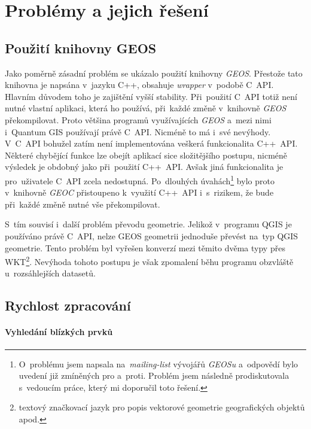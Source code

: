 \chapter{Problémy a jejich řešení}
\label{7-problemy}

\section{Použití knihovny GEOS}
\label{problemy-geos}
Jako poměrně zásadní problém se ukázalo použití knihovny \textit{GEOS}. 
Přestože tato knihovna je napsána v~jazyku C++, obsahuje \textit{wrapper} 
v~podobě C~API. Hlavním důvodem toho je zajištění vyšší 
stability. Při~použití C~API totiž není nutné vlastní aplikaci,
která ho používá, při~každé změně v~knihovně \textit{GEOS} překompilovat. 
Proto většina programů využívajících \textit{GEOS} a~mezi nimi i~Quantum 
GIS používají právě C~API. Nicméně to má i~své nevýhody. V~C~API bohužel 
zatím není implementována veškerá funkcionalita C++~API. Některé chybějící 
funkce lze obejít aplikací sice složitějšího postupu, nicméně výsledek je 
obdobný jako při~použití C++~API. Avšak jiná funkcionalita je pro~uživatele 
C~API zcela nedostupná. Po~dlouhých úvahách\footnote{O~problému jsem napsala
na~\textit{mailing-list} vývojářů \textit{GEOSu} a~odpovědí bylo uvedení 
již zmíněných pro a~proti. Problém jsem následně prodiskutovala s~vedoucím 
práce, který mi doporučil toto řešení.} bylo proto v~knihovně \textit{GEOC} 
přistoupeno k~využití C++~API i~s~rizikem, že bude při~každé změně nutné 
vše překompilovat. %

S~tím souvisí i~další problém převodu geometrie. Jelikož v~programu QGIS je 
používáno právě C~API, nelze GEOS geometrii jednoduše převést na~typ QGIS 
geometrie. Tento problém byl vyřešen konverzí mezi těmito dvěma typy přes 
WKT\footnote{textový značkovací jazyk pro popis vektorové 
geometrie geografických objektů apod.}. Nevýhoda tohoto postupu je však 
zpomalení běhu programu obzvláště u~rozsáhlejších datasetů. 


\section{Rychlost zpracování}
\label{problemy-rychlost}

\subsubsection{Vyhledání blízkých prvků}

